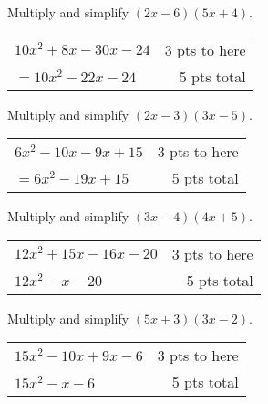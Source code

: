 {
	Multiply and simplify $(2x-6)(5x+4)$.
}
{
	\begin{tabular}{l r}
	$10x^2+8x-30x-24$ & 3 pts to here\\
	$=10x^2-22x-24$ & 5 pts total
	\end{tabular}
}

{
	Multiply and simplify $(2x-3)(3x-5)$.
}
{
	\begin{tabular}{l r}
	$6x^2-10x-9x+15$ & 3 pts to here\\
	$=6x^2-19x+15$ & 5 pts total
	\end{tabular}
}

{
	Multiply and simplify $(3x-4)(4x+5)$.
}
{
	\begin{tabular}{l r}
	$12x^2+15x-16x-20$ & 3 pts to here\\
	$12x^2-x-20$ & 5 pts total
	\end{tabular}
}

{
	Multiply and simplify $(5x+3)(3x-2)$.
}
{
	\begin{tabular}{l r}
	$ 15x^2-10x+9x-6$ & 3 pts to here\\
	$ 15x^2-x-6$ & 5 pts total
	\end{tabular}
}
